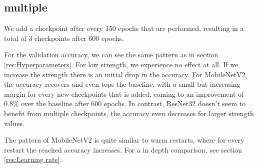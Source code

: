\subsection{multiple}
We add a checkpoint after every 150 epochs that are performed, resulting in a
total of 3 checkpoints after 600 epochs.

For the validation accuracy, we can see the same pattern as in section
\ref{res:Hyperparameters}. For low strength, we experience no effect at all. If
we increase the strength there is an initial drop in the accuracy. For
MobileNetV2, the accuracy recovers and even tops the baseline, with a small but
increasing margin for every new checkpoints that is added, coming to an
improvement of 0.8\% over the baseline after 600 epochs. In contrast, ResNet32
doesn't seem to benefit from multiple checkpoints, the accuracy even decreases
for larger strength values.

The pattern of MobileNetV2 is quite similar to warm restarts, where for every
restart the reached accuracy increases. For a in depth comparison, see section
\ref{res:Learning rate}.

